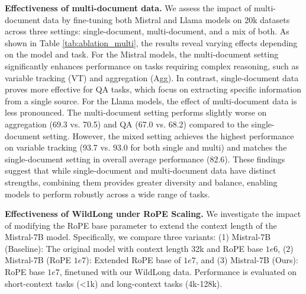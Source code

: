 \textbf{Effectiveness of multi-document data.}
We assess the impact of multi-document data by fine-tuning both Mistral and Llama models on 20k datasets across three settings: single-document, multi-document, and a mix of both. As shown in Table \ref{tab:ablation_multi}, the results reveal varying effects depending on the model and task.
For the Mistral models, the multi-document setting significantly enhances performance on tasks requiring complex reasoning, such as variable tracking (VT) and aggregation (Agg). In contrast, single-document data proves more effective for QA tasks, which focus on extracting specific information from a single source.
For the Llama models, the effect of multi-document data is less pronounced. The multi-document setting performs slightly worse on aggregation (69.3 vs. 70.5) and QA (67.0 vs. 68.2) compared to the single-document setting. However, the mixed setting achieves the highest performance on variable tracking (93.7 vs. 93.0 for both single and multi) and matches the single-document setting in overall average performance (82.6).
These findings suggest that while single-document and multi-document data have distinct strengths, combining them provides greater diversity and balance, enabling models to perform robustly across a wide range of tasks.



\textbf{Effectiveness of WildLong under RoPE Scaling.} 
We investigate the impact of modifying the RoPE base parameter to extend the context length of the Mistral-7B model. Specifically, we compare three variants: (1) Mistral-7B (Baseline): The original model with context length 32k and RoPE base $1e6$, (2) Mistral-7B (RoPE $1e7$): Extended RoPE base of $1e7$, and (3) Mistral-7B (Ours):  RoPE base $1e7$, finetuned with our WildLong data. Performance is evaluated on short-context tasks (\textless 1k) and long-context tasks (4k-128k).

